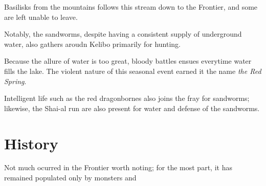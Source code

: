 \documentclass[../main.tex]{subfiles}
\begin{document}
Basilisks from the mountains follows this stream down to the Frontier,
and some are left unable to leave.

Notably, the sandworms, despite having a consistent supply of underground
water, also gathers aroudn Kelibo primarily for hunting.

Because the allure of water is too great, bloody battles ensues everytime
water fills the lake. The violent nature of this seasonal event earned it
the name \emph{the Red Spring}.

Intelligent life such as the red dragonbornes also joins the fray for
sandworms; likewise, the Shai-al run are also present for water and
defense of the sandworms.

\section{History}
Not much ocurred in the Frontier worth noting; for the most part, it has
remained populated only by monsters and 
\end{document}
